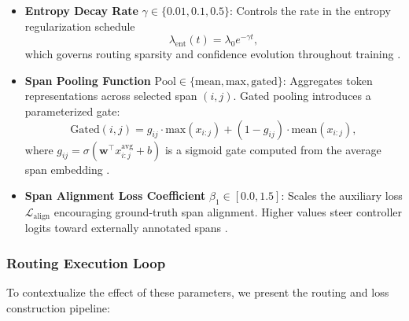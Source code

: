 \begin{itemize}[leftmargin=1.5em]
  \item \textbf{Entropy Decay Rate} \(\gamma \in \{0.01, 0.1, 0.5\}\): Controls the rate in the entropy regularization schedule
  \begin{equation}
  \lambda_{\mathrm{ent}}(t) = \lambda_0 e^{-\gamma t},
  \label{eq:entropy_decay_exp}
  \end{equation}
  which governs routing sparsity and confidence evolution throughout training \cite{grandvalet2006entropy, pereyra2017regularizing}.

  \item \textbf{Span Pooling Function} \(\mathrm{Pool} \in \{\mathrm{mean}, \mathrm{max}, \mathrm{gated}\}\): Aggregates token representations across selected span \((i, j)\). Gated pooling introduces a parameterized gate:
  \begin{equation}
  \text{Gated}(i, j) = g_{ij} \cdot \mathrm{max}(x_{i:j}) + (1 - g_{ij}) \cdot \mathrm{mean}(x_{i:j}),
  \label{eq:gated_pooling}
  \end{equation}
  where \(g_{ij} = \sigma(\mathbf{w}^\top x_{i:j}^{\text{avg}} + b)\) is a sigmoid gate computed from the average span embedding \cite{kim2019unsupervised, zilliz2023pooling}.

  \item \textbf{Span Alignment Loss Coefficient} \(\beta_1 \in [0.0, 1.5]\): Scales the auxiliary loss \(\mathcal{L}_{\text{align}}\) encouraging ground-truth span alignment. Higher values steer controller logits toward externally annotated spans \cite{liu2024structured}.
\end{itemize}

\subsubsection*{Routing Execution Loop}

To contextualize the effect of these parameters, we present the routing and loss construction pipeline:


